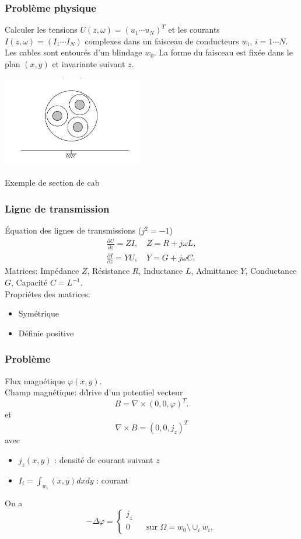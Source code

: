 \begin{frame}
\frametitle{Probl\`eme physique}
Calculer les tensions $U(z,\omega) =(u_1 \cdots u_N)^T$ et les courants $I(z,\omega) = (I_1\cdots I_N)$ complexes dans un faisceau de conducteurs $w_i$, $i=1\cdots N$. Les cables sont entour\'es d'un blindage $w_0$. La forme du faisceau est fix\'ee dans le plan $(x,y)$ et invariante suivant $z$.
\begin{center}
\includegraphics[height=4cm]{figures/f1}
\end{center}
Exemple de section de cab
\end{frame} 


\begin{frame}
\frametitle{Ligne de transmission}
\'Equation des lignes de transmissions ($j^2=-1$)
\begin{eqnarray*}
\frac{\partial U}{\partial z} =ZI, \quad Z=R+j\omega L,\\
\frac{\partial I}{\partial z} =YU, \quad Y=G+j\omega C.
\end{eqnarray*}
Matrices: 
Imp\'edance $Z$, R\'esistance $R$, Inductance $L$, Admittance $Y$, Conductance $G$, Capacit\'e
$C=L^{-1}.$\\[0.4cm]
Propri\'etes des matrices: 
\begin{itemize}
\item Sym\'etrique
\item D\'efinie positive
\end{itemize}

\end{frame} 

\begin{frame}
\frametitle{Probl\`eme}
Flux magn\'etique $\varphi(x,y)$. \\
Champ magn\'etique: d\'drive d'un potentiel vecteur 
$$B=\nabla \times (0,0,\varphi)^T.$$ et
$$\nabla\times B=(0,0,j_z)^T$$ avec
\begin{itemize}
\item  $j_z(x,y)$ : densit\'e de courant suivant $z$
\item  $I_i= \int _{w_i}(x,y)dxdy$ :  courant
\end{itemize}
On a
\begin{equation}
-\Delta\varphi =
\begin{cases}
j_z \\ 
0 \qquad \text{sur } \Omega =w_0 \setminus \cup_i w_i,
\end{cases}
\end{equation} 
\end{frame}

